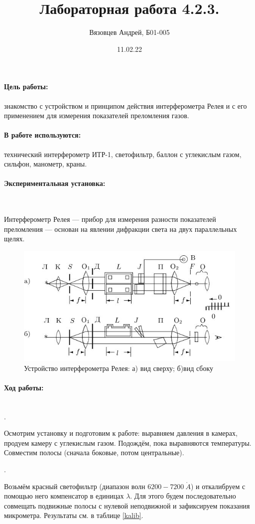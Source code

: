 \documentclass[a4paper, 12pt]{article}
\author{Вязовцев Андрей, Б01-005}
\date{11.02.22}
\title{Лабораторная работа 4.2.3. }
\renewcommand{\AA}{\ensuremath{\mathring{A}}}
\newcommand{\parag}[1]{\paragraph*{#1:}}
\newcounter{Points}
\newcommand{\point}{\arabic{Points}. \addtocounter{Points}{1}}
\begin{document}
\maketitle

\parag {Цель работы} знакомство с устройством и принципом действия интерферометра Релея и с его применением для измерения показателей преломления газов.

\parag {В работе используются} технический интерферометр ИТР-1, светофильтр, баллон с углекислым газом, сильфон, манометр, краны.


\parag {Экспериментальная установка} ~

Интерферометр Релея --- прибор для измерения разности показателей преломления --- основан на явлении дифракции света на двух параллельных щелях.

\begin{figure}[!h]
    \includegraphics[scale = 1]{Workplace}
    \centering
    \caption{Устройство интерферометра Релея: а) вид сверху; б)вид сбоку}
\end{figure}

\parag {Ход работы} ~\\

\point Осмотрим установку и подготовим к работе: выравняем давления в камерах, продуем камеру с углекислым газом. Подождём, пока выравняются температуры. Совместим полосы (сначала боковые, потом центральные).

\point Возьмём красный светофильтр (диапазон волн $6200-7200~\AA$) и откалибруем с помощью него компенсатор в единицах $\lambda$. Для этого будем последовательно совмещать подвижные полосы с нулевой неподвижной и зафиксируем показания микрометра. Результаты см. в таблице \ref{kalib}.
\end{document}
